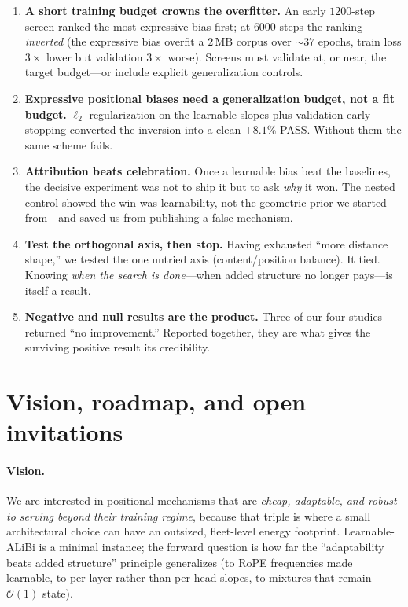 \documentclass[11pt,a4paper]{article}
\begin{document}
\begin{enumerate}[leftmargin=1.6em,itemsep=3pt]
\item \textbf{A short training budget crowns the overfitter.} An early
  $1200$-step screen ranked the most expressive bias first; at $6000$ steps the
  ranking \emph{inverted} (the expressive bias overfit a $2$\,MB corpus over
  $\sim$$37$ epochs, train loss $3\times$ lower but validation $3\times$ worse).
  Screens must validate at, or near, the target budget---or include explicit
  generalization controls.
\item \textbf{Expressive positional biases need a generalization budget, not a
  fit budget.} $\ell_2$ regularization on the learnable slopes plus validation
  early-stopping converted the inversion into a clean $+8.1\%$ PASS. Without them
  the same scheme fails.
\item \textbf{Attribution beats celebration.} Once a learnable bias beat the
  baselines, the decisive experiment was not to ship it but to ask \emph{why} it
  won. The nested control showed the win was learnability, not the geometric
  prior we started from---and saved us from publishing a false mechanism.
\item \textbf{Test the orthogonal axis, then stop.} Having exhausted ``more
  distance shape,'' we tested the one untried axis (content/position balance). It
  tied. Knowing \emph{when the search is done}---when added structure no longer
  pays---is itself a result.
\item \textbf{Negative and null results are the product.} Three of our four
  studies returned ``no improvement.'' Reported together, they are what gives the
  surviving positive result its credibility.
\end{enumerate}

\section{Vision, roadmap, and open invitations}
\label{sec:roadmap}

\paragraph{Vision.} We are interested in positional mechanisms that are
\emph{cheap, adaptable, and robust to serving beyond their training regime},
because that triple is where a small architectural choice can have an
outsized, fleet-level energy footprint. Learnable-ALiBi is a minimal instance;
the forward question is how far the ``adaptability beats added structure''
principle generalizes (to RoPE frequencies made learnable, to per-layer rather
than per-head slopes, to mixtures that remain $\mathcal{O}(1)$ state).
\end{document}
